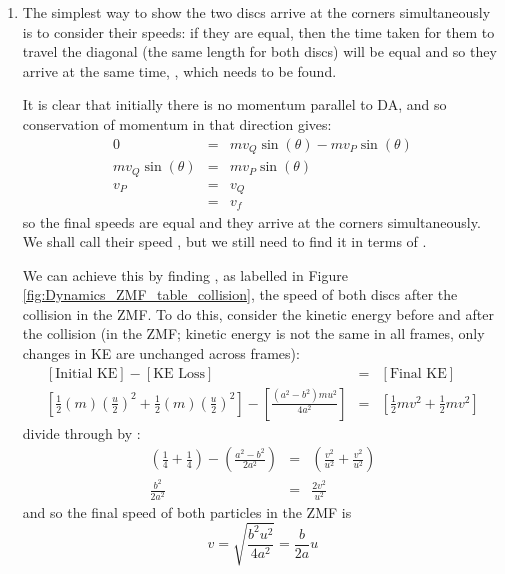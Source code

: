 \begin{problem}
{\begin{enumerate}
	\item The simplest way to show the two discs arrive at the corners simultaneously is to consider their speeds: if they are equal, then the time taken for them to travel the diagonal (the same length for both discs) will be equal and so they arrive at the same time, , which needs to be found.

It is clear that initially there is no momentum parallel to DA, and so conservation of momentum in that direction gives:
\begin{eqnarray*} 
0 &=& mv_{Q} \sin(\theta) - mv_{P}\sin(\theta) \\ 
mv_{Q}\sin(\theta) &=& mv_{P}\sin(\theta) \\ 
v_{P} &=& v_{Q} \\ 
&=& v_{f}
\end{eqnarray*}
so the final speeds are equal and they arrive at the corners simultaneously. We shall call their speed , but we still need to find it in terms of .

We can achieve this by finding , as labelled in Figure \ref{fig:Dynamics_ZMF_table_collision}, the speed of both discs after the collision in the ZMF. To do this, consider the kinetic energy before and after the collision (in the ZMF; kinetic energy is not the same in all frames, only changes in KE are unchanged across frames):
\begin{eqnarray*} 
\left[ \text{Initial KE} \right] - \left[ \text{KE Loss}\right] &=& \left[ \text{Final KE} \right] \\
\left[ \frac{1}{2}(m)\left(\frac{u}{2}\right)^{2} + \frac{1}{2}(m)\left(\frac{u}{2}\right)^{2} \right] - \left[\frac{(a^{2} - b^{2})mu^{2}}{4a^{2}}\right] &=& \left[ \frac{1}{2}mv^{2} + \frac{1}{2}mv^{2}\right]
\end{eqnarray*}
divide through by :
\begin{eqnarray*} 
\left( \frac{1}{4} + \frac{1}{4} \right) - \left( \frac{a^{2} - b^{2}}{2a^{2}} \right) &=& \left( \frac{v^{2}}{u^{2}} + \frac{v^{2}}{u^{2}} \right) \\
\frac{b^2}{2a^{2}} &=& \frac{2v^{2}}{u^{2}} 
\end{eqnarray*}
and so the final speed of both particles in the ZMF is
\begin{equation*} 
v = \sqrt{\frac{b^{2}u^{2}}{4a^{2}}} = \frac{b}{2a} u 
\end{equation*}


\end{enumerate}}
\end{problem}
